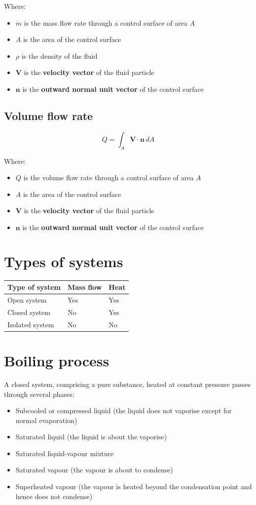 \documentclass[11pt]{article}
\begin{document}
Where:
\begin{itemize}
\item \(\dot{m}\) is the mass flow rate through a control surface of area \(A\)
\item \(A\) is the area of the control surface
\item \(\rho\) is the density of the fluid
\item \(\boldsymbol{V}\) is the \textbf{velocity vector} of the fluid particle
\item \(\boldsymbol{n}\) is the \textbf{outward normal unit vector} of the control surface
\end{itemize}
\subsection{Volume flow rate}
\label{sec:org9bf6da9}
\[Q = \int_A \boldsymbol{V} \cdot \boldsymbol{n} \, dA\]

Where:
\begin{itemize}
\item \(Q\) is the volume flow rate through a control surface of area \(A\)
\item \(A\) is the area of the control surface
\item \(\boldsymbol{V}\) is the \textbf{velocity vector} of the fluid particle
\item \(\boldsymbol{n}\) is the \textbf{outward normal unit vector} of the control surface
\end{itemize}

\newpage
\section{Types of systems}
\label{sec:org19858ad}
\begin{center}
\begin{tabular}{l|l|l}
Type of system & Mass flow & Heat\\
\hline
Open system & Yes & Yes\\
Closed system & No & Yes\\
Isolated system & No & No\\
\end{tabular}
\end{center}
\section{Boiling process}
\label{sec:org6498a16}
A closed system, comprising a pure substance, heated at constant pressure passes through several phases:
\begin{itemize}
\item Subcooled or compressed liquid (the liquid does not vaporise except for normal evaporation)
\item Saturated liquid (the liquid is about the vaporise)
\item Saturated liquid-vapour mixture
\item Saturated vapour (the vapour is about to condense)
\item Superheated vapour (the vapour is heated beyond the condensation point and hence does not condense)
\end{itemize}
\end{document}
